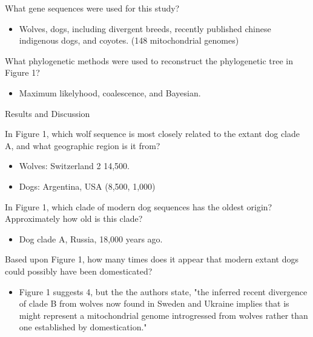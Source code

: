 \documentclass[12pt,a4paper]{article}
\begin{document}
\begin{itemize}
\begin{itemize}
\begin{itemize}
                \end{itemize}
            {\color{darklc} \item  What gene sequences were used for this study?}
                \begin{itemize}
                    \item Wolves, dogs, including divergent breeds, recently published chinese indigenous dogs, and coyotes. (148 mitochondrial genomes)
                \end{itemize}
            {\color{darklc} \item  What phylogenetic methods were used to reconstruct the phylogenetic tree in Figure 1?}
                \begin{itemize}
                    \item Maximum likelyhood, coalescence, and Bayesian.
                \end{itemize}
        \end{itemize}
    \item Results and Discussion
        \begin{itemize}
            {\color{darklc} \item In Figure 1, which wolf sequence is most closely related to the extant dog clade A, and what geographic region is it from?}
                \begin{itemize}
                    \item Wolves: Switzerland 2 14,500.
                    \item Dogs: Argentina, USA (8,500, 1,000) 
                \end{itemize}
            {\color{darklc} \item In Figure 1, which clade of modern dog sequences has the oldest origin? Approximately how old is this clade?}
                \begin{itemize}
                    \item Dog clade A, Russia, 18,000 years ago.
                \end{itemize}
            {\color{darklc} \item Based upon Figure 1, how many times does it appear that modern extant dogs could possibly have been domesticated?}
                \begin{itemize}
                    \item Figure 1 suggests 4, but the the authors state, {\color{G-Moon}"the inferred recent divergence of clade B from wolves now found in Sweden and Ukraine implies that is might represent a mitochondrial genome introgressed from wolves rather than one established by domestication."}

\end{itemize}
\end{itemize}
\end{itemize}
\end{document}
